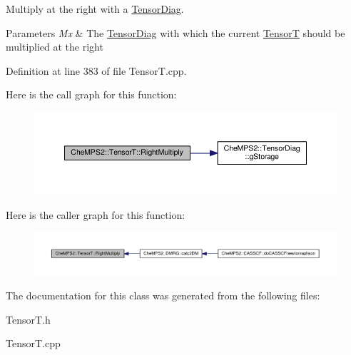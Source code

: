 Multiply at the right with a \hyperlink{classCheMPS2_1_1TensorDiag}{Tensor\-Diag}. 


\begin{DoxyParams}{Parameters}
{\em Mx} & The \hyperlink{classCheMPS2_1_1TensorDiag}{Tensor\-Diag} with which the current \hyperlink{classCheMPS2_1_1TensorT}{Tensor\-T} should be multiplied at the right \\
\hline
\end{DoxyParams}


Definition at line 383 of file Tensor\-T.\-cpp.



Here is the call graph for this function\-:\nopagebreak
\begin{figure}[H]
\begin{center}
\leavevmode
\includegraphics[width=350pt]{classCheMPS2_1_1TensorT_ad53db81f1f1bf33512f93a23abc0ed50_cgraph}
\end{center}
\end{figure}




Here is the caller graph for this function\-:\nopagebreak
\begin{figure}[H]
\begin{center}
\leavevmode
\includegraphics[width=350pt]{classCheMPS2_1_1TensorT_ad53db81f1f1bf33512f93a23abc0ed50_icgraph}
\end{center}
\end{figure}




The documentation for this class was generated from the following files\-:\begin{DoxyCompactItemize}
\item 
Tensor\-T.\-h\item 
Tensor\-T.\-cpp\end{DoxyCompactItemize}
